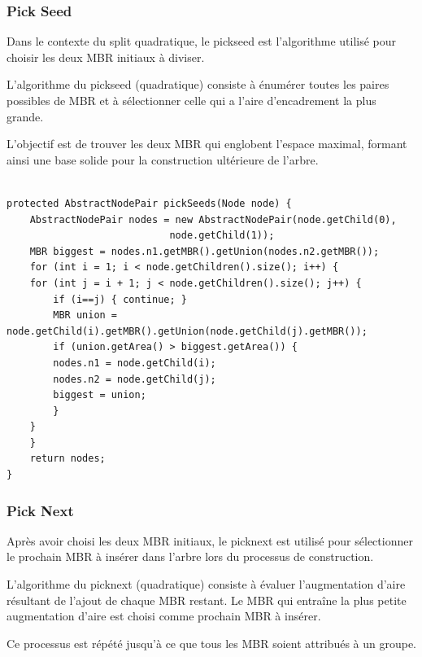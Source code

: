 \documentclass {article}
\begin{document}
\subsubsection {Pick Seed}


Dans le contexte du split quadratique, le pickseed est l'algorithme utilisé pour choisir les 
deux MBR initiaux à diviser.

L'algorithme du pickseed (quadratique) consiste à énumérer toutes les paires possibles de MBR et à sélectionner 
celle qui a l'aire d'encadrement la plus grande.

L'objectif est de trouver les deux MBR qui englobent l'espace maximal, formant ainsi une base solide 
pour la construction ultérieure de l'arbre.

\begin{verbatim}

protected AbstractNodePair pickSeeds(Node node) {
    AbstractNodePair nodes = new AbstractNodePair(node.getChild(0), 
						    node.getChild(1));
    MBR biggest = nodes.n1.getMBR().getUnion(nodes.n2.getMBR());
    for (int i = 1; i < node.getChildren().size(); i++) {
	for (int j = i + 1; j < node.getChildren().size(); j++) {
	    if (i==j) { continue; }
	    MBR union = node.getChild(i).getMBR().getUnion(node.getChild(j).getMBR());
	    if (union.getArea() > biggest.getArea()) {
		nodes.n1 = node.getChild(i);
		nodes.n2 = node.getChild(j);
		biggest = union;
	    }
	}
    }
    return nodes;
}
\end{verbatim}


\subsubsection {Pick Next}

Après avoir choisi les deux MBR initiaux, le picknext est utilisé pour sélectionner le prochain MBR 
à insérer dans l'arbre lors du processus de construction.

L'algorithme du picknext (quadratique) consiste à évaluer l'augmentation d'aire résultant de l'ajout de chaque MBR 
restant. Le MBR qui entraîne la plus petite augmentation d'aire est choisi 
comme prochain MBR à insérer.

Ce processus est répété jusqu'à ce que tous les MBR soient attribués à un groupe.
\end{document}
